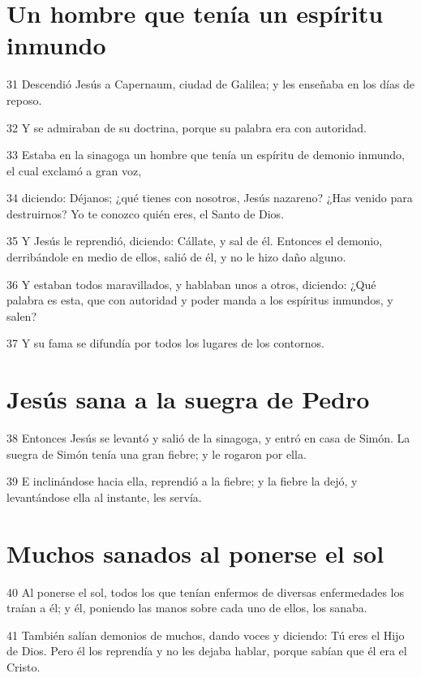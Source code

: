 \section*{Un hombre que tenía un espíritu inmundo}

\par 31 Descendió Jesús a Capernaum, ciudad de Galilea; y les enseñaba en los días de reposo.
\par 32 Y se admiraban de su doctrina, porque su palabra era con autoridad.
\par 33 Estaba en la sinagoga un hombre que tenía un espíritu de demonio inmundo, el cual exclamó a gran voz,
\par 34 diciendo: Déjanos; ¿qué tienes con nosotros, Jesús nazareno? ¿Has venido para destruirnos? Yo te conozco quién eres, el Santo de Dios.
\par 35 Y Jesús le reprendió, diciendo: Cállate, y sal de él. Entonces el demonio, derribándole en medio de ellos, salió de él, y no le hizo daño alguno.
\par 36 Y estaban todos maravillados, y hablaban unos a otros, diciendo: ¿Qué palabra es esta, que con autoridad y poder manda a los espíritus inmundos, y salen?
\par 37 Y su fama se difundía por todos los lugares de los contornos.

\section*{Jesús sana a la suegra de Pedro}

\par 38 Entonces Jesús se levantó y salió de la sinagoga, y entró en casa de Simón. La suegra de Simón tenía una gran fiebre; y le rogaron por ella.
\par 39 E inclinándose hacia ella, reprendió a la fiebre; y la fiebre la dejó, y levantándose ella al instante, les servía.

\section*{Muchos sanados al ponerse el sol}

\par 40 Al ponerse el sol, todos los que tenían enfermos de diversas enfermedades los traían a él; y él, poniendo las manos sobre cada uno de ellos, los sanaba.
\par 41 También salían demonios de muchos, dando voces y diciendo: Tú eres el Hijo de Dios. Pero él los reprendía y no les dejaba hablar, porque sabían que él era el Cristo.

